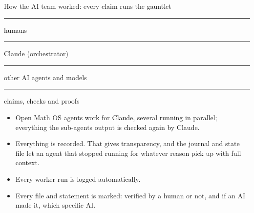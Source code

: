 \documentclass[aspectratio=169,11pt]{beamer}
\begin{document}
\begin{frame}{How the AI team worked: every claim runs the gauntlet}

  \vspace{1pt}
  {\scriptsize
  \textcolor{atomgreen}{\rule{7pt}{7pt}} humans \quad
  \textcolor{symblue}{\rule{7pt}{7pt}} Claude (orchestrator) \quad
  \textcolor{asymorange}{\rule{7pt}{7pt}} other AI agents and models \quad
  \textcolor{ink!30}{\rule{7pt}{7pt}} claims, checks and proofs \par}

  \vspace{3pt}
  \raggedright\scriptsize
  \begin{itemize}\setlength{\itemsep}{0pt}
    \item Open Math OS agents work for Claude, several running in parallel;
      everything the sub-agents output is checked again by Claude.
    \item Everything is recorded. That gives transparency, and the journal and state file
      let an agent that stopped running for whatever reason pick up with full context.
    \item Every worker run is logged automatically.
    \item Every file and statement is marked: verified by a human or not, and if an AI made it,
      which specific AI.
  \end{itemize}
\end{frame}
\end{document}

